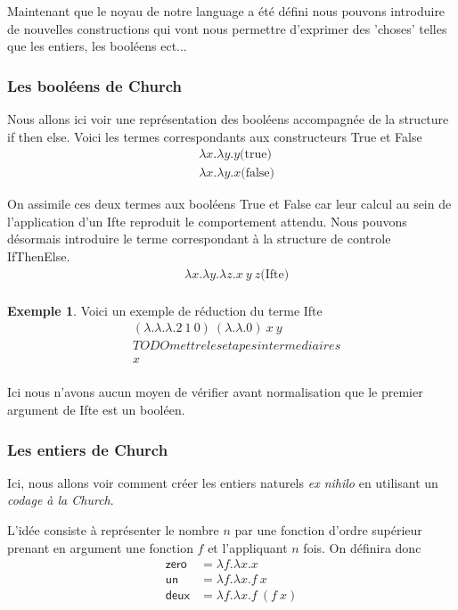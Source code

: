 \documentclass {article}
\theoremstyle{definition}
\newtheorem{example}{Exemple}
\theoremstyle{remark}
\begin{document}
Maintenant que le noyau de notre language a été défini nous pouvons introduire
de nouvelles constructions qui vont nous permettre d'exprimer des 'choses' %
telles que les entiers, les booléens ect...

\subsubsection{Les booléens de Church}

Nous allons ici voir une représentation des booléens accompagnée de la 
structure if then else.
Voici les termes correspondants aux constructeurs True et False
\begin{align*}
  &\lambda x.\lambda y. y \mbox{(true)} \\
  &\lambda x.\lambda y. x \mbox{(false)} 
\end{align*}

On assimile ces deux termes aux booléens True et False car leur calcul au sein
de l'application d'un Ifte reproduit le comportement attendu.
Nous pouvons désormais introduire le terme correspondant à la structure de 
controle IfThenElse.
\begin{align*}
  &\lambda x.\lambda y.\lambda z. x\: y\: z \mbox{(Ifte)} \\
\end{align*}

\begin{example}
  Voici un exemple de réduction du terme Ifte
  \begin{align*}
    &(\lambda .\lambda .\lambda . 2\: 1\: 0) \: (\lambda . \lambda . 0) \: x \: y  \\
    & TODO mettre les etapes intermediaires \\
    & x \\
  \end{align*}
\end{example}

Ici nous n'avons aucun moyen de vérifier avant normalisation que le premier
argument de Ifte est un booléen. %

\subsubsection{Les entiers de Church}

Ici, nous allons voir comment créer
les entiers naturels \textit{ex nihilo} en utilisant un \emph{codage à
  la Church}.

L'idée consiste à représenter le nombre \(n\) par une fonction d'ordre
supérieur prenant en argument une fonction \(f\) et l'appliquant \(n\)
fois. On définira donc 
%
\begin{align*}
\mathsf{zero} &= \lambda f. \lambda x. x \\
\mathsf{un}   &= \lambda f. \lambda x. f\: x \\
\mathsf{deux} &= \lambda f. \lambda x. f\: (f\: x)
\end{align*}
\end{document}
